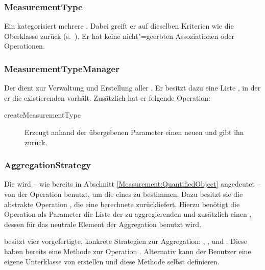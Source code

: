 \subsubsection{MeasurementType}
Ein  kategorisiert mehrere . Dabei greift er auf dieselben Kriterien wie die Oberklasse 
zurück (s.~). Er hat keine nicht"=geerbten Assoziationen oder Operationen.


\subsubsection{MeasurementTypeManager}
Der  dient zur Verwaltung und Erstellung aller . Er besitzt dazu eine Liste ,
in der er die existierenden  vorhält. Zusätzlich hat er folgende Operation:

\begin{description}
	\item[createMeasurementType] Erzeugt anhand der übergebenen Parameter einen neuen  und gibt ihn zurück.
\end{description}


\subsubsection{AggregationStrategy}
Die  wird -- wie bereits in Abschnitt \ref{Measurement:QuantifiedObject} angedeutet -- von der Operation  benutzt,
um die  eines  zu bestimmen. Dazu besitzt sie die abstrakte Operation , die eine 
berechnete  zurückliefert. Hierzu benötigt die Operation als Parameter die Liste der zu aggregierenden  und
zusätzlich einen , dessen  für das neutrale Element der Aggregation benutzt wird. 

 besitzt vier vorgefertigte, konkrete Strategien zur Aggregation:
, ,  und
. Diese haben bereits eine Methode zur Operation . Alternativ
kann der Benutzer eine eigene Unterklasse von  erstellen und diese Methode selbst definieren.

